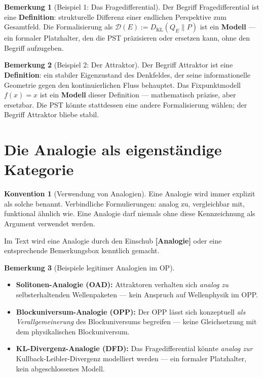 \documentclass[11pt,a4paper]{article}
\theoremstyle{plain}
\theoremstyle{definition}
\newtheorem{konvention}{Konvention}[section]
\newtheorem{remark}{Bemerkung}[section]
\begin{document}
\begin{remark}[Beispiel 1: Das Fragedifferential]
Der Begriff \glqq{}Fragedifferential\grqq{} ist eine \textbf{Definition}:
strukturelle Differenz einer endlichen Perspektive zum Gesamtfeld.
Die Formalisierung als $\mathcal{D}(E) := D_{\mathrm{KL}}(Q_E \| P)$
ist ein \textbf{Modell} --- ein formaler Platzhalter, den die PST pr\"{a}zisieren
oder ersetzen kann, ohne den Begriff aufzugeben.
\end{remark}

\begin{remark}[Beispiel 2: Der Attraktor]
Der Begriff \glqq{}Attraktor\grqq{} ist eine \textbf{Definition}: ein stabiler
Eigenzustand des Denkfeldes, der seine informationelle Geometrie gegen den
kontinuierlichen Fluss behauptet. Das Fixpunktmodell $f(x) = x$ ist ein
\textbf{Modell} dieser Definition --- mathematisch pr\"{a}zise, aber ersetzbar.
Die PST k\"{o}nnte stattdessen eine andere Formalisierung w\"{a}hlen; der Begriff
\glqq{}Attraktor\grqq{} bliebe stabil.
\end{remark}

\section{Die Analogie als eigenst\"{a}ndige Kategorie}

\begin{konvention}[Verwendung von Analogien]
Eine Analogie wird immer explizit als solche benannt. Verbindliche
Formulierungen: \glqq{}analog zu\grqq{}, \glqq{}vergleichbar mit\grqq{},
\glqq{}funktional \"{a}hnlich wie\grqq{}. Eine Analogie darf niemals ohne
diese Kennzeichnung als Argument verwendet werden.

Im Text wird eine Analogie durch den Einschub \textbf{[Analogie]} oder
eine entsprechende Bemerkungsbox kenntlich gemacht.
\end{konvention}

\begin{remark}[Beispiele legitimer Analogien im OP]
\begin{itemize}
  \item \textbf{Solitonen-Analogie (OAD):} Attraktoren verhalten sich
        \emph{analog zu} selbsterhaltenden Wellenpaketen --- kein Anspruch
        auf Wellenphysik im OPP.
  \item \textbf{Blockuniversum-Analogie (OPP):} Der OPP l\"{a}sst sich
        konzeptuell \emph{als Verallgemeinerung} des Blockuniversums begreifen
        --- keine Gleichsetzung mit dem physikalischen Blockuniversum.
  \item \textbf{KL-Divergenz-Analogie (DFD):} Das Fragedifferential k\"{o}nnte
        \emph{analog zur} Kullback-Leibler-Divergenz modelliert werden --- ein
        formaler Platzhalter, kein abgeschlossenes Modell.
\end{itemize}
\end{remark}
\end{document}
